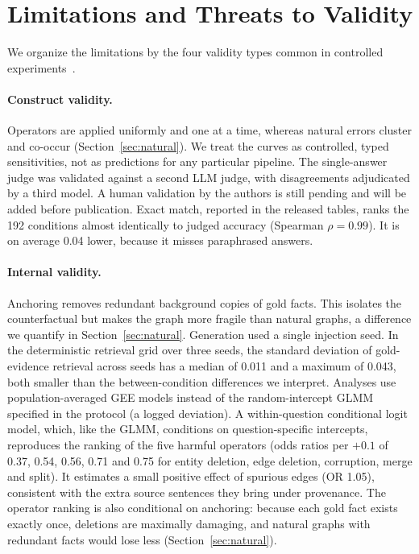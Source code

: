 \documentclass[11pt]{article}
\begin{document}
\section{Limitations and Threats to Validity}\label{sec:threats}
We organize the limitations by the four validity types common in controlled experiments~\cite{wohlin2012experimentation}.
\paragraph{Construct validity.} Operators are applied uniformly and one at a time, whereas natural errors cluster and co-occur (Section~\ref{sec:natural}). We treat the curves as controlled, typed sensitivities, not as predictions for any particular pipeline. The single-answer judge was validated against a second LLM judge, with disagreements adjudicated by a third model. A human validation by the authors is still pending and will be added before publication. Exact match, reported in the released tables, ranks the 192 conditions almost identically to judged accuracy (Spearman $\rho=0.99$). It is on average 0.04 lower, because it misses paraphrased answers.

\paragraph{Internal validity.} Anchoring removes redundant background copies of gold facts. This isolates the counterfactual but makes the graph more fragile than natural graphs, a difference we quantify in Section~\ref{sec:natural}. Generation used a single injection seed. In the deterministic retrieval grid over three seeds, the standard deviation of gold-evidence retrieval across seeds has a median of 0.011 and a maximum of 0.043, both smaller than the between-condition differences we interpret. Analyses use population-averaged GEE models instead of the random-intercept GLMM specified in the protocol (a logged deviation). A within-question conditional logit model, which, like the GLMM, conditions on question-specific intercepts, reproduces the ranking of the five harmful operators (odds ratios per $+0.1$ of 0.37, 0.54, 0.56, 0.71 and 0.75 for entity deletion, edge deletion, corruption, merge and split). It estimates a small positive effect of spurious edges (OR 1.05), consistent with the extra source sentences they bring under provenance. The operator ranking is also conditional on anchoring: because each gold fact exists exactly once, deletions are maximally damaging, and natural graphs with redundant facts would lose less (Section~\ref{sec:natural}).
\end{document}
